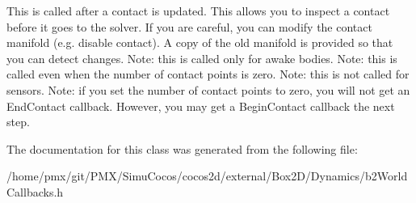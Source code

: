 This is called after a contact is updated. This allows you to inspect a contact before it goes to the solver. If you are careful, you can modify the contact manifold (e.\+g. disable contact). A copy of the old manifold is provided so that you can detect changes. Note\+: this is called only for awake bodies. Note\+: this is called even when the number of contact points is zero. Note\+: this is not called for sensors. Note\+: if you set the number of contact points to zero, you will not get an End\+Contact callback. However, you may get a Begin\+Contact callback the next step. 

The documentation for this class was generated from the following file\+:\begin{DoxyCompactItemize}
\item 
/home/pmx/git/\+P\+M\+X/\+Simu\+Cocos/cocos2d/external/\+Box2\+D/\+Dynamics/b2\+World\+Callbacks.\+h\end{DoxyCompactItemize}
